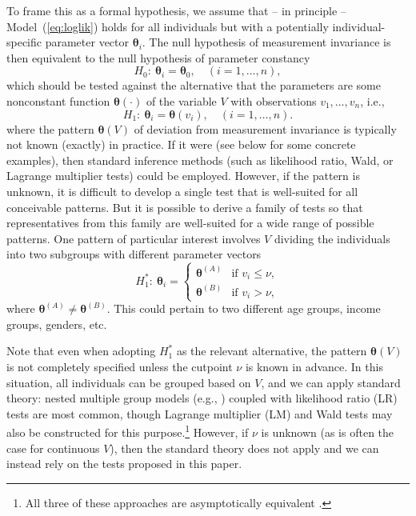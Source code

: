 \documentclass[man]{apa}
\begin{document}
To frame this as a formal hypothesis, we assume that -- in principle --
Model~(\ref{eq:loglik}) holds for all individuals but with a
potentially individual-specific 
parameter vector ${\bm \theta}_i$. The null hypothesis of measurement invariance
is then equivalent to the null hypothesis of parameter constancy
\begin{equation}
    \label{eq:h0}
    H_0:~ {\bm \theta}_i = {\bm \theta}_0,\quad (i=1,\ldots,n),
\end{equation}
which should be tested against the alternative that the parameters
are some nonconstant function ${\bm \theta}(\cdot)$ of the variable $V$ with observations
$v_1, \dots, v_n$, i.e.,
\begin{equation}
    \label{eq:h1}
    H_1:~ {\bm \theta}_i = {\bm \theta}(v_i),\quad (i=1,\ldots,n).
\end{equation}
where the pattern ${\bm \theta}(V)$ of deviation from measurement invariance is
typically not known (exactly) in practice. If it were (see below for
some concrete examples), then standard inference methods (such as likelihood
ratio, Wald, or Lagrange multiplier tests) could be employed. However,
if the pattern is unknown, it is difficult to develop a single test
that is well-suited for all conceivable patterns. But it is possible to
derive a family of tests so that representatives from this family are well-suited
for a wide range of possible patterns. One pattern of particular interest
involves $V$ dividing the individuals into two subgroups with different
parameter vectors
\begin{equation}
  \label{eq:h1*}
  H_1^*:~ {\bm \theta}_i = \left\{ \begin{array}{ll}
    {\bm \theta}^{(A)} & \mbox{if } v_i \le \nu, \\
    {\bm \theta}^{(B)} & \mbox{if } v_i >   \nu,
  \end{array} \right.
\end{equation}
where ${\bm \theta}^{(A)} \neq {\bm \theta}^{(B)}$. This could pertain to 
two different age groups, income groups, genders, etc.

Note that even when adopting $H_1^*$ as the relevant alternative, the pattern ${\bm \theta}(V)$
is not completely specified unless the cutpoint $\nu$ is known in
advance. 
In this situation, all individuals can be grouped based on
$V$, and we can apply standard
theory: nested multiple group
models (e.g., ) coupled with likelihood ratio (LR)
tests are most common,
though Lagrange multiplier (LM) and Wald tests may also be constructed for this
purpose.\footnote{All three of these approaches are asymptotically
  equivalent \cite{Sat89}.}  However, if $\nu$ is unknown (as is often
the case for continuous $V$), then the standard theory does not apply
and we can instead rely on the tests proposed in this paper.
\end{document}
